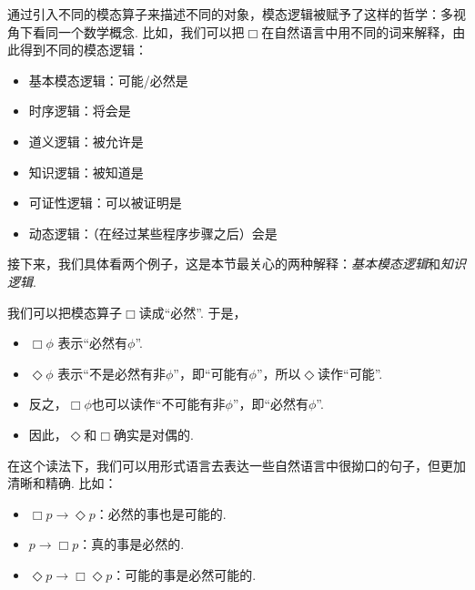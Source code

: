 通过引入不同的模态算子来描述不同的对象，模态逻辑被赋予了这样的哲学：多视角下看同一个数学概念. 比如，我们可以把$\Box$在自然语言中用不同的词来解释，由此得到不同的模态逻辑：
\begin{itemize}
    \item 基本模态逻辑：可能/必然是
    \item 时序逻辑：将会是
    \item 道义逻辑：被允许是
    \item 知识逻辑：被知道是
    \item 可证性逻辑：可以被证明是
    \item 动态逻辑：（在经过某些程序步骤之后）会是
\end{itemize}

接下来，我们具体看两个例子，这是本节最关心的两种解释：\emph{基本模态逻辑}和\emph{知识逻辑}. 
\begin{example}[基本模态逻辑]
我们可以把模态算子$\Box$读成“必然”. 于是，
\begin{itemize}
    \item $\Box\phi$ 表示“必然有$\phi$”. 
    \item $\Diamond\phi$ 表示“不是必然有非$\phi$”，即“可能有$\phi$”，所以$\Diamond$读作“可能”. 
    \item 反之，$\Box\phi$也可以读作“不可能有非$\phi$”，即“必然有$\phi$”. 
    \item 因此，$\Diamond$和$\Box$确实是对偶的. 
\end{itemize}

在这个读法下，我们可以用形式语言去表达一些自然语言中很拗口的句子，但更加清晰和精确. 比如：
\begin{itemize}
    \item $\Box p\to\Diamond p$：必然的事也是可能的. 
    \item $p\to\Box p$：真的事是必然的. 
    \item $\Diamond p\to\Box\Diamond p$：可能的事是必然可能的. 
\end{itemize}
\end{example}

